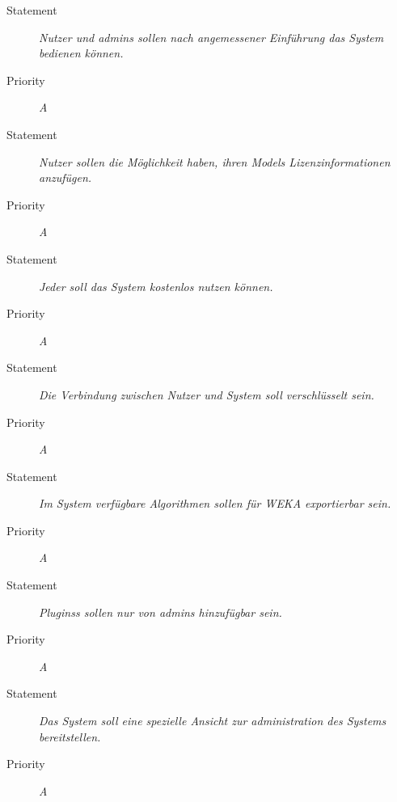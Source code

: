 \UR
\begin{description}
\item[Statement] \textit{Nutzer und \glspl{admin} sollen nach angemessener Einführung das System bedienen können.}
\item[Priority] \textit{A}
\end{description}

\UR
\begin{description}
\item[Statement] \textit{Nutzer sollen die Möglichkeit haben, ihren \glspl{Model} Lizenzinformationen anzufügen.}
  \item[Priority]
    \textit{A}
\end{description}

\UR
\begin{description}
\item[Statement] \textit{Jeder soll das System kostenlos nutzen können.}
\item[Priority] \textit{A}
\end{description}

\UR
\begin{description}
\item[Statement] \textit{Die Verbindung zwischen Nutzer und System soll verschlüsselt sein.}
\item[Priority] \textit{A}
\end{description}

\UR
\begin{description}
\item[Statement] \textit{Im System verfügbare Algorithmen sollen für WEKA exportierbar sein.}
\item[Priority] \textit{A}
\end{description}

\UR
\begin{description}
\item[Statement] \textit{\glspl{Plugins} sollen nur von \glspl{admin} hinzufügbar sein.}
\item[Priority] \textit{A}
\end{description}

\UR
\begin{description}
\item[Statement] \textit{Das System soll eine spezielle Ansicht zur administration des Systems bereitstellen.}
\item[Priority] \textit{A}
\end{description}

